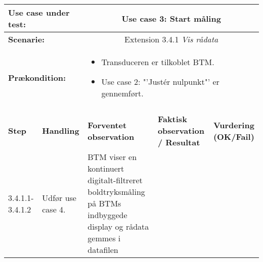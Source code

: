 \begin{tabular}{|p{1cm}|p{3cm}|p{4cm}|p{4cm}|p{2cm}|}
\hline
\multicolumn{2}{|p{3cm}|}{\textbf{Use case under test:}} & \multicolumn{3}{c|}{Use case 3: Start måling} \\\hline

\multicolumn{2}{|p{3cm}|}{\textbf{Scenarie:}} & \multicolumn{3}{c|}{Extension 3.4.1 \textit{Vis rådata}} \\\hline

\multicolumn{2}{|p{3cm}|}{\textbf{Prækondition:}}  & \multicolumn{3}{l|}{\parbox{0.6\textwidth}{
\begin{itemize}[label=$\circ$]
\item Transduceren er tilkoblet BTM.
\item Use case 2: "'Justér nulpunkt"' er gennemført.  
\end{itemize} }}\\\hline

\multicolumn{5}{|c|}{} \\\hline

\textbf{Step} & \textbf{Handling} & \textbf{Forventet observation} & \textbf{Faktisk observation / Resultat} & \textbf{Vurdering (OK/Fail)}\\\hline

3.4.1.1-3.4.1.2 & Udfør use case 4. & BTM viser en kontinuert digitalt-filtreret boldtryksmåling på BTMs indbyggede display og rådata gemmes i datafilen &  & \\\hline

\end{tabular}

\newpage

